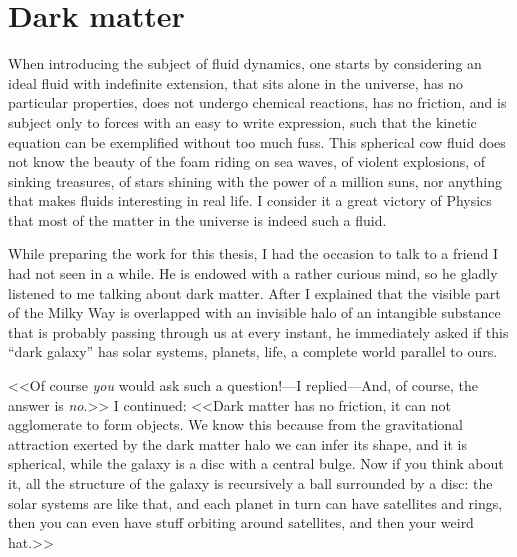 \chapter{Dark matter}



When introducing the subject of fluid dynamics, one starts by considering an
ideal fluid with indefinite extension, that sits alone in the universe, has no
particular properties, does not undergo chemical reactions, has no friction,
and is subject only to forces with an easy to write expression, such that the
kinetic equation can be exemplified without too much fuss. This spherical cow
fluid does not know the beauty of the foam riding on sea waves, of violent
explosions, of sinking treasures, of stars shining with the power of a million
suns, nor anything that makes fluids interesting in real life. I consider it a
great victory of Physics that most of the matter in the universe is indeed such
a fluid.

While preparing the work for this thesis, I had the occasion to talk to a
friend I had not seen in a while. He is endowed with a rather curious mind, so
he gladly listened to me talking about dark matter. After I explained that the
visible part of the Milky Way is overlapped with an invisible halo of an
intangible substance that is probably passing through us at every instant, he
immediately asked if this ``dark galaxy'' has solar systems, planets, life,
a complete world parallel to ours.

<<Of course \emph{you} would ask such a question!---I replied---And, of course,
the answer is \emph{no}.>> I continued: <<Dark matter has no friction, it can
not agglomerate to form objects. We know this because from the gravitational
attraction exerted by the dark matter halo we can infer its shape, and it is
spherical, while the galaxy is a disc with a central bulge. Now if you think
about it, all the structure of the galaxy is recursively a ball surrounded by a
disc: the solar systems are like that, and each planet in turn can have
satellites and rings, then you can even have stuff orbiting around satellites,
and then your weird hat.>>

